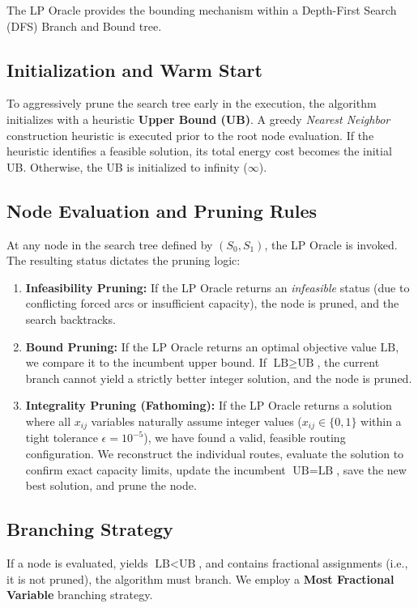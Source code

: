\documentclass[11pt,a4paper]{article}
\begin{document}
The LP Oracle provides the bounding mechanism within a Depth-First Search (DFS) Branch and Bound tree.

\subsection{Initialization and Warm Start}
To aggressively prune the search tree early in the execution, the algorithm initializes with a heuristic \textbf{Upper Bound (UB)}. A greedy \emph{Nearest Neighbor} construction heuristic is executed prior to the root node evaluation. 
If the heuristic identifies a feasible solution, its total energy cost becomes the initial UB. Otherwise, the UB is initialized to infinity ($\infty$).

\subsection{Node Evaluation and Pruning Rules}
At any node in the search tree defined by $(S_0, S_1)$, the LP Oracle is invoked. The resulting status dictates the pruning logic:

\begin{enumerate}
    \item \textbf{Infeasibility Pruning:} If the LP Oracle returns an \emph{infeasible} status (due to conflicting forced arcs or insufficient capacity), the node is pruned, and the search backtracks.
    \item \textbf{Bound Pruning:} If the LP Oracle returns an optimal objective value $\text{LB}$, we compare it to the incumbent upper bound. If $\text{LB} \ge \text{UB}$, the current branch cannot yield a strictly better integer solution, and the node is pruned.
    \item \textbf{Integrality Pruning (Fathoming):} If the LP Oracle returns a solution where all $x_{ij}$ variables naturally assume integer values ($x_{ij} \in \{0, 1\}$ within a tight tolerance $\epsilon = 10^{-5}$), we have found a valid, feasible routing configuration. We reconstruct the individual routes, evaluate the solution to confirm exact capacity limits, update the incumbent $\text{UB} = \text{LB}$, save the new best solution, and prune the node.
\end{enumerate}

\subsection{Branching Strategy}
If a node is evaluated, yields $\text{LB} < \text{UB}$, and contains fractional assignments (i.e., it is not pruned), the algorithm must branch. We employ a \textbf{Most Fractional Variable} branching strategy. 
\end{document}

